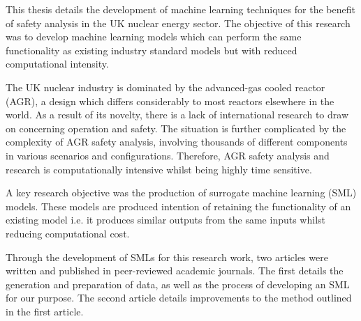 %
{
	
	\singlespacing \noindent
	This thesis details the development of machine learning techniques for the benefit of safety analysis in the UK nuclear energy sector. The objective of this research was to develop machine learning models which can perform the same functionality as existing industry standard models but with reduced computational intensity.  
	
	\singlespacing \noindent
	The UK nuclear industry is dominated by the advanced-gas cooled reactor (AGR), a design which differs considerably to most reactors elsewhere in the world. As a result of its novelty, there is a lack of international research to draw on concerning operation and safety. The situation is further complicated by the complexity of AGR safety analysis, involving thousands of different components in various scenarios and configurations. Therefore, AGR safety analysis and research is computationally intensive whilst being highly time sensitive.
	
	\singlespacing \noindent
	A key research objective was the production of surrogate machine learning (SML) models. These models are produced intention of retaining the functionality of an existing model i.e. it produces similar outputs from the same inputs whilst reducing computational cost.
	
	\singlespacing \noindent
	Through the development of SMLs for this research work, two articles were written and published in peer-reviewed academic journals. The first details the generation and preparation of data, as well as the process of developing an SML for our purpose. The second article details improvements to the method outlined in the first article. 
	


}

